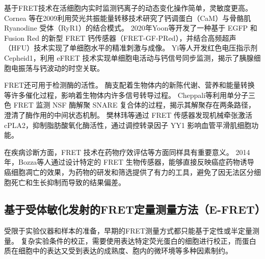 基于FRET技术在活细胞内实时监测钙离子的动态变化操作简单，灵敏度更高。
Cornea 等在2009利用荧光共振能量转移技术研究了钙调蛋白（CaM）与骨骼肌 Ryanodine 受体（RyR1）的结合模式。
2020年Yoon等开发了一种基于 EGFP 和 Fusion Red 的新型 FRET 钙传感器（FRET-GF-PRed），并结合高频超声（HFU）技术实现了单细胞水平的精准刺激与成像。
Yi等人开发红色电压指示剂 Cepheid1，利用 eFRET 技术实现单细胞电活动与钙信号同步监测，揭示了胰腺细胞电振荡与钙波动的时空关联。

FRET还可用于检测酶的活性。
酶支配着生物体内的新陈代谢、营养和能量转换等许多催化过程，影响着生物体内许多信号转导过程。
Cheppali等利用单分子三色 FRET 监测 NSF 酶解聚 SNARE 复合体的过程，揭示其解聚存在两条路径，澄清了酶作用的中间状态机制。
樊林玮等通过 FRET 传感器发现机械牵张激活 cPLA2，抑制脂肪酸氧化酶活性，通过调控转录因子 YY1 影响血管平滑肌细胞功能。

在疾病诊断方面，FRET 技术在药物疗效评估等方面同样具有重要意义。
2014年，Bozza等人通过设计特定的 FRET 生物传感器，能够直接反映癌症药物诱导癌细胞凋亡的效果，为药物的研发和筛选提供了有力的工具，避免了因无法区分细胞死亡和生长抑制而导致的结果偏差。

\subsection{基于受体敏化发射的FRET定量测量方法（E-FRET）}

受限于实验仪器和样本的准备，早期的FRET测量方式都只能基于定性或半定量测量。
复杂实验条件的校正，需要使用表达特定荧光蛋白的细胞进行校正，而蛋白质在细胞中的表达又受到表达的成熟度、胞内的微环境等多种因素制约。


